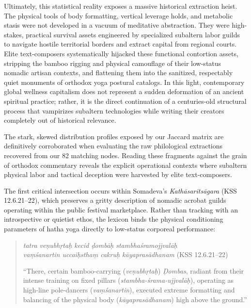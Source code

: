 \documentclass[11pt,twoside,letterpaper]{article}
\begin{document}
Ultimately, this statistical reality exposes a massive historical extraction heist. The physical tools of body formatting, vertical leverage holds, and metabolic stasis were not developed in a vacuum of meditative abstraction. They were high-stakes, practical survival assets engineered by specialized subaltern labor guilds to navigate hostile territorial borders and extract capital from regional courts. Elite text-composers systematically hijacked these functional contortion assets, stripping the bamboo rigging and physical camouflage of their low-status nomadic artisan contexts, and flattening them into the sanitized, respectably quiet monuments of orthodox yoga postural catalogs. In this light, contemporary global wellness capitalism does not represent a sudden deformation of an ancient spiritual practice; rather, it is the direct continuation of a centuries-old structural process that vampirizes subaltern technologies while writing their creators completely out of historical relevance.

The stark, skewed distribution profiles exposed by our Jaccard matrix are definitively corroborated when evaluating the raw philological extractions recovered from our 82 matching nodes. Reading these fragments against the grain of orthodox commentary reveals the explicit operational contexts where subaltern physical labor and tactical deception were harvested by elite text-composers. 

The first critical intersection occurs within Somadeva's \textit{Kathāsaritsāgara} (KSS 12.6.21–22), which preserves a gritty description of nomadic acrobat guilds operating within the public festival marketplace. Rather than tracking with an introspective or quietist ethos, the lexicon binds the physical conditioning parameters of hatha yoga directly to low-status corporeal performance:

\begin{quote}
\small
\textit{tatra veṇubhṛtaḥ kecid ḍombāḥ stambhaśramojjvalāḥ \\
vaṃśanartin uccaiḥsthaṃ cakruḥ kāyaprasādhanam} (KSS 12.6.21–22)
\medskip

``There, certain bamboo-carrying (\textit{veṇubhṛtaḥ}) \textit{Ḍombas}, radiant from their intense training on fixed pillars (\textit{stambha-śrama-ujjvalāḥ}), operating as high-line pole-dancers (\textit{vaṃśanartin}), executed extreme formatting and balancing of the physical body (\textit{kāyaprasādhanam}) high above the ground.''
\end{quote}
\end{document}
